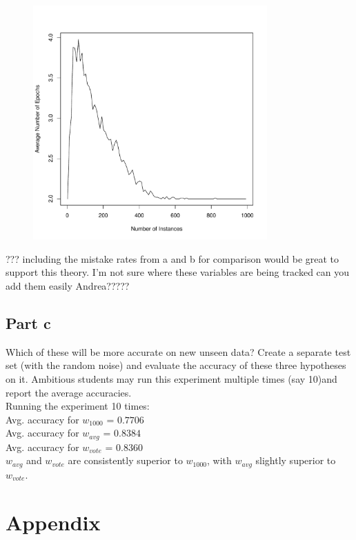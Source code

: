 \documentclass{article}
\begin{document}
\begin{figure}[h!]
\centering
\includegraphics[width=0.8\textwidth]{epochsB.pdf}
\label{epoch}
\end{figure}

??? including the mistake rates from a and b for comparison would be great to support this theory. I'm not sure where these variables are being tracked can you add them easily Andrea?????




\clearpage
\subsection*{Part c}

Which of these will be more accurate on new unseen data? Create a separate test set (with the random noise) and evaluate the accuracy of these three hypotheses on it. Ambitious students may run this experiment multiple times (say 10)and report the average accuracies.
\\
Running the experiment 10 times: \\
Avg. accuracy for $w_{1000}$ = $0.7706$ \\
Avg. accuracy for $w_{avg}$ = $0.8384$ \\
Avg. accuracy for $w_{vote}$ = $0.8360$ \\

\noindent $w_{avg}$ and $w_{vote}$ are consistently superior to $w_{1000}$, with $w_{avg}$ slightly superior to $w_{vote}$.

\clearpage
\section{Appendix}

\begin{tiny}



\end{tiny}
\end{document}
